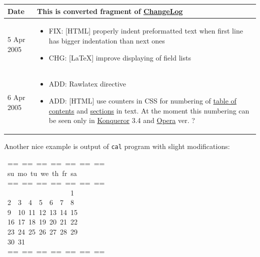 \documentclass[12pt]{article}
\begin{document}
\setlongtables
\begin{center}
\begin{longtable}[c]{|p{}|p{}|}\hline

Date
&
This is converted fragment of \href{\#lchangelog}{ChangeLog}

 \\ \hline
\endhead

5 Apr 2005
&
\begin{itemize}
\item
FIX: [HTML] properly indent preformatted
text when first line has bigger
indentation than next ones

\item
CHG: [\LaTeX{}] improve displaying
of field lists
\end{itemize}
 \\ \hline

6 Apr 2005
&
\begin{itemize}
\item
ADD: Rawlatex directive

\item
ADD: [HTML] use counters in CSS for
numbering of \href{\#ltable-of-contents}{table of contents}
and \href{\#lsections}{sections} in text. At the moment
this numbering can be seen only in
\href{http://www.kde.org}{Konqueror} 3.4 and \href{http://www.opera.com}{Opera} ver. ?
\end{itemize}
 \\ \hline
\end{longtable}
\end{center}

Another nice example is output of \texttt{cal} program with slight modifications:

\begin{ttfamily}\begin{flushleft}
\mbox{~==~==~==~==~==~==~==}\\
\mbox{~su~mo~tu~we~th~fr~sa~}\\
\mbox{~==~==~==~==~==~==~==}\\
\mbox{~~~~~~~~~~~~~~~~~~~1}\\
\mbox{~2~~3~~4~~5~~6~~7~~8}\\
\mbox{~9~~10~11~12~13~14~15}\\
\mbox{~16~17~18~19~20~21~22}\\
\mbox{~23~24~25~26~27~28~29}\\
\mbox{~30~31}\\
\mbox{~==~==~==~==~==~==~==}\\
\end{flushleft}\end{ttfamily}
\end{document}
